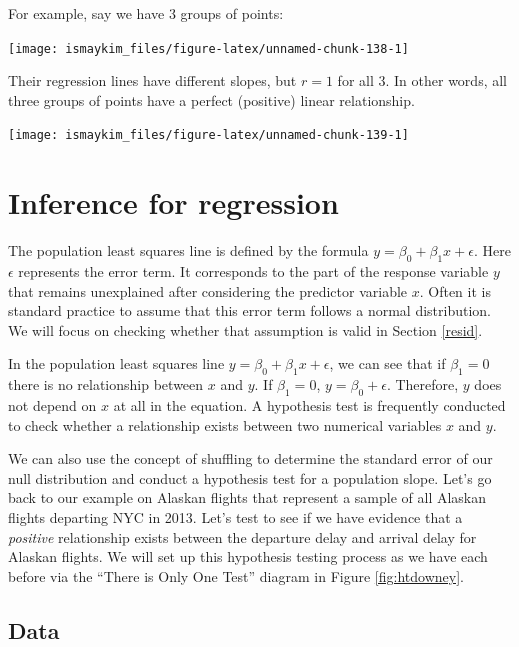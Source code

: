 \documentclass[]{tufte-book}
\begin{document}
For example, say we have 3 groups of points:

\begin{center}\texttt{[image: ismaykim\_files/figure-latex/unnamed-chunk-138-1]} \end{center}

Their regression lines have different slopes, but \(r = 1\) for all 3.
In other words, all three groups of points have a perfect (positive)
linear relationship.

\begin{center}\texttt{[image: ismaykim\_files/figure-latex/unnamed-chunk-139-1]} \end{center}

\section{Inference for regression}\label{inference-for-regression}

The population least squares line is defined by the formula
\(y = \beta_0 + \beta_1 x + \epsilon\). Here \(\epsilon\) represents the
error term. It corresponds to the part of the response variable \(y\)
that remains unexplained after considering the predictor variable \(x\).
Often it is standard practice to assume that this error term follows a
normal distribution. We will focus on checking whether that assumption
is valid in Section \ref{resid}.

In the population least squares line
\(y = \beta_0 + \beta_1 x + \epsilon\), we can see that if
\(\beta_1 = 0\) there is no relationship between \(x\) and \(y\). If
\(\beta_1 = 0\), \(y = \beta_0 + \epsilon\). Therefore, \(y\) does not
depend on \(x\) at all in the equation. A hypothesis test is frequently
conducted to check whether a relationship exists between two numerical
variables \(x\) and \(y\).

We can also use the concept of shuffling to determine the standard error
of our null distribution and conduct a hypothesis test for a population
slope. Let's go back to our example on Alaskan flights that represent a
sample of all Alaskan flights departing NYC in 2013. Let's test to see
if we have evidence that a \emph{positive} relationship exists between
the departure delay and arrival delay for Alaskan flights. We will set
up this hypothesis testing process as we have each before via the
``There is Only One Test'' diagram in Figure \ref{fig:htdowney}.

\subsection{Data}\label{data-2}
\end{document}
